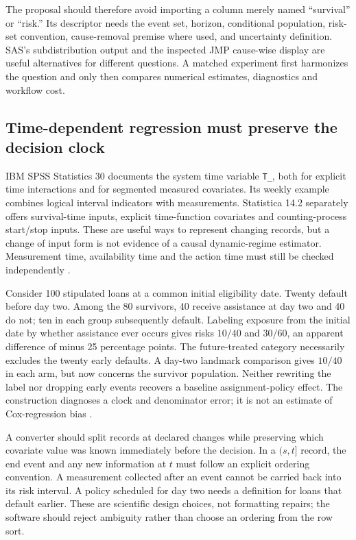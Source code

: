 The proposal should therefore avoid importing a column merely named
``survival'' or ``risk.'' Its descriptor needs the event set, horizon,
conditional population, risk-set convention, cause-removal premise where
used, and uncertainty definition. SAS's subdistribution output and the
inspected JMP cause-wise display are useful alternatives for different
questions. A matched experiment first harmonizes the question and only then
compares numerical estimates, diagnostics and workflow cost.

\subsection{Time-dependent regression must preserve the decision clock}

IBM SPSS Statistics 30 documents the system time variable \texttt{T\_},
both for explicit time interactions and for segmented measured covariates.
Its weekly example combines logical interval indicators with measurements.
Statistica 14.2 separately offers survival-time inputs, explicit time-function
covariates and counting-process start/stop inputs. These are useful ways to
represent changing records, but a change of input form is not evidence of a
causal dynamic-regime estimator. Measurement time, availability time and the
action time must still be checked independently
\citep{exec14_survival_ibm,exec14_survival_statistica}.

Consider 100 stipulated loans at a common initial eligibility date. Twenty
default before day two. Among the 80 survivors, 40 receive assistance at day
two and 40 do not; ten in each group subsequently default. Labeling exposure
from the initial date by whether assistance ever occurs gives risks $10/40$
and $30/60$, an apparent difference of minus 25 percentage points. The
future-treated category necessarily excludes the twenty early defaults.
A day-two landmark comparison gives $10/40$ in each arm, but now concerns
the survivor population. Neither rewriting the label nor dropping early events
recovers a baseline assignment-policy effect. The construction diagnoses a
clock and denominator error; it is not an estimate of Cox-regression bias
\citep{exec14_survival_exact}.

A converter should split records at declared changes while preserving which
covariate value was known immediately before the decision. In a $(s,t]$
record, the end event and any new information at $t$ must follow an explicit
ordering convention. A measurement collected after an event cannot be carried
back into its risk interval. A policy scheduled for day two needs a definition
for loans that default earlier. These are scientific design choices, not
formatting repairs; the software should reject ambiguity rather than choose
an ordering from the row sort.

